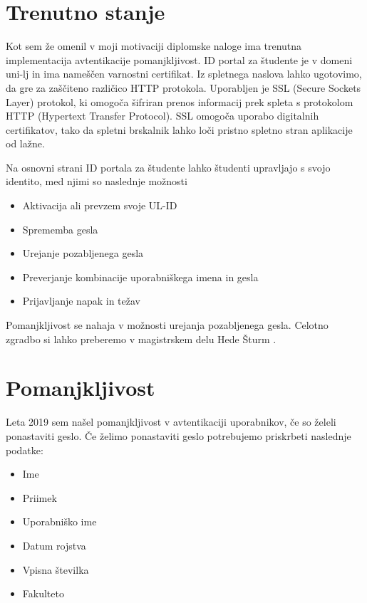 \documentclass[a4paper,12pt,openright]{book}
\begin{document}
{\section{Trenutno stanje}

Kot sem že omenil v moji motivaciji diplomske naloge ima trenutna implementacija avtentikacije pomanjkljivost. 
\newline 
ID portal za študente je v domeni uni-lj in ima nameščen varnostni certifikat. Iz spletnega naslova lahko ugotovimo, da gre za zaščiteno različico HTTP protokola. Uporabljen je SSL (Secure Sockets Layer) protokol, ki omogoča šifriran prenos informacij prek spleta s protokolom HTTP (Hypertext Transfer Protocol). SSL omogoča uporabo digitalnih certifikatov, tako da spletni brskalnik lahko loči pristno spletno stran aplikacije od lažne. 

Na osnovni strani ID portala za študente lahko študenti upravljajo s svojo identito, med njimi so naslednje možnosti

\begin{itemize}
    \item Aktivacija ali prevzem svoje UL-ID
    \item Sprememba gesla
    \item Urejanje pozabljenega gesla
    \item Preverjanje kombinacije uporabniškega imena in gesla
    \item Prijavljanje napak in težav
\end{itemize}

Pomanjkljivost se nahaja v možnosti urejanja pozabljenega gesla. Celotno zgradbo si lahko preberemo v magistrskem delu Hede Šturm \cite{magistrska}.

\section{Pomanjkljivost}
Leta 2019 sem našel pomanjkljivost v avtentikaciji uporabnikov, če so želeli ponastaviti geslo. Če želimo ponastaviti geslo potrebujemo priskrbeti naslednje podatke:
\begin{itemize}
    \item Ime
    \item Priimek
    \item Uporabniško ime
    \item Datum rojstva
    \item Vpisna številka
    \item Fakulteto
\end{itemize}

}
\end{document}
